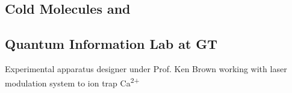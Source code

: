\documentclass[letterpaper, article]{deedy-resume-openfont}
\begin{document}
\begin{minipage}[t]{0.33\textwidth}
\subsection{Cold Molecules and \hfill}
\subsection{Quantum Information \hfill Lab at GT \hfill}
Experimental apparatus designer under Prof. Ken Brown working with laser modulation system to ion trap Ca\textsuperscript{2+}


\end{minipage}
\end{document}
